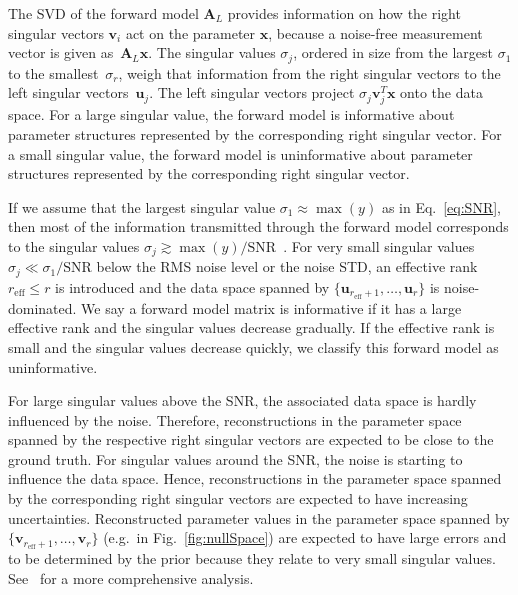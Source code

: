 The SVD of the forward model $\bm{A}_L$ provides information on how the right singular vectors $\bm{v}_i$ act on the parameter $\bm{x}$, because a noise-free measurement vector is given as~$\bm{A}_L\bm{x}$.
The singular values $\sigma_j $, ordered in size from the largest $\sigma_1$ to the smallest~$\sigma_{r}$, weigh that information from the right singular vectors to the left singular vectors~$\bm{u}_j$.
The left singular vectors project $\sigma_j \bm{v}^T_j \bm{x} $ onto the data space.
For a large singular value, the forward model is informative about parameter structures represented by the corresponding right singular vector. 
For a small singular value, the forward model is uninformative about parameter structures represented by the corresponding right singular vector.

If we assume that the largest singular value $\sigma_1  \approx \max(y)$ as in Eq.~\ref{eq:SNR}, then most of the information transmitted through the forward model corresponds to the singular values $\sigma_j \gtrsim \max(y)/ \text{SNR}$~\cite{fox2025BlokkLecNot}.
For very small singular values $\sigma_j \ll \sigma_1/\text{SNR}$ below the RMS noise level or the noise STD, an effective rank $r_{\text{eff}} \leq r$ is introduced and the data space spanned by $ \{\bm{u}_{r_{\text{eff}} +1}, \dots ,\bm{u}_r \}$ is noise-dominated.
We say a forward model matrix is informative if it has a large effective rank and the singular values decrease gradually.
If the effective rank is small and the singular values decrease quickly, we classify this forward model as uninformative.

For large singular values above the SNR, the associated data space is hardly influenced by the noise.
Therefore, reconstructions in the parameter space spanned by the respective right singular vectors are expected to be close to the ground truth.
For singular values around the SNR, the noise is starting to influence the data space.
Hence, reconstructions in the parameter space spanned by the corresponding right singular vectors are expected to have increasing uncertainties.
Reconstructed parameter values in the parameter space spanned by $ \{\bm{v}_{r_{\text{eff}} +1}, \dots ,\bm{v}_r \}$ (e.g.~in Fig.~\ref{fig:nullSpace}) are expected to have large errors and to be determined by the prior because they relate to very small singular values.
See~\cite{tan2016LecNot} for a more comprehensive analysis.

